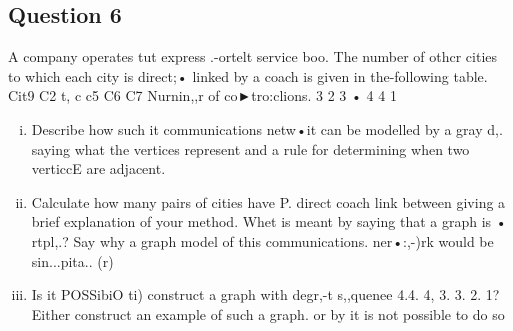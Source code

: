 \subsection{Question 6} A company operates tut express .-ortelt service boo.%
The number of othcr cities to which each city is direct;• linked by a coach is given in the-following table. 
Cit9 
C2 t, c c5 C6 C7 
Nurnin,,r of co►tro:clions. 3 2 3 • 
4 
4 
1 
\begin{enumerate}[(i)]
\item Describe how such it communications netw•it can be modelled by a gray d,. saying what the vertices represent and a rule for determining when two verticcE are adjacent. 
\item  Calculate how many pairs of cities have P. direct coach link between giving a brief explanation of your method. Whet is meant by saying that a graph is • rtpl,.? Say why a graph model of this communications. ner•:,-)rk would be sin...pita.. 
(r) 
\item  Is it POSSibiO ti) construct a graph with degr,-t s,,quenee 4.4. 4, 3. 3. 2. 1? Either construct an example of such a graph. or by it is not possible to do so 
\end{enumerate}
